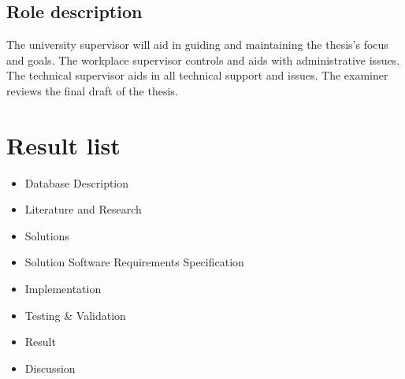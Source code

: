 \documentclass[12pt,a4paper]{article}
\begin{document}
\subsection*{Role description}
The university supervisor will aid in guiding and maintaining the thesis's focus and goals. The workplace supervisor controls and aids with administrative issues. The technical supervisor aids in all technical support and issues. The examiner reviews the final draft of the thesis. 




\section*{Result list}
\begin{itemize}
\item Database Description
\item Literature and Research
\item Solutions
\item Solution Software Requirements Specification
\item Implementation
\item Testing \& Validation
\item Result
\item Discussion
\end{itemize}
\end{document}
